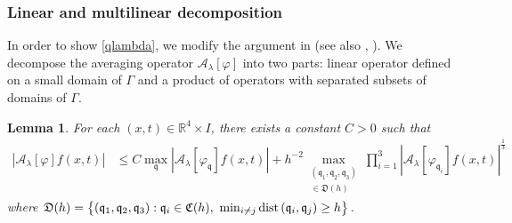\documentclass[10pt] %
{amsart}
\theoremstyle{plain}
\newtheorem{lem}[thm]{Lemma}
\numberwithin{equation}{section}
\newcommand{\dist} {\text{dist\! }}
\begin{document}
\subsubsection*{Linear and multilinear decomposition}

In order to show \eqref{qlambda}, we modify the argument in \cite[Lemma 2.8]{HL} (see also \cite[Lemma 4.1]{KLO23}, \cite{HKL2}). 
We decompose the averaging operator $\mathcal A_\lambda[\varphi] $ into two parts: linear operator defined on a small domain of $\Gamma$ and a  product of operators with separated subsets of domains of $\Gamma$.

\begin{lem}\label{lem-multi-decomp}
 For each $(x,t)\in \mathbb R^4\times I$, there exists a constant $C>0$ such that
\begin{align}\label{multi-decomp}
|\mathcal A_\lambda[\varphi] f(x,t) | 
&\le C \max_{\mathfrak q} |\mathcal A_\lambda[\varphi_{\mathfrak q}] f(x,t)| 
+ h^{-2}\max_{\substack{(\mathfrak q_1,\mathfrak q_2,\mathfrak q_3)\\ \in \mathfrak D(h)}}
\prod_{i=1}^3  |\mathcal A_\lambda [\varphi_{\mathfrak q_i}] f(x,t)|^{\frac13}
\end{align}
where $\mathfrak D(h)  = \big\{ (\mathfrak q_1,\mathfrak q_2,\mathfrak q_3) : \mathfrak q_i \in \mathfrak C(h),~ \min_{i\neq j}\dist(\mathfrak q_i,\mathfrak q_j) \ge h \big\}$. 
\end{lem}
\end{document}
